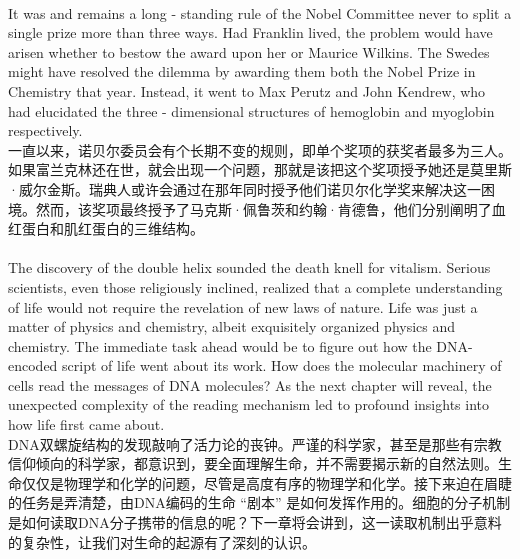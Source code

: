 \documentclass{article}
\begin{document}
\\
It was and remains a long - standing rule of the Nobel Committee never to split a single prize more than three ways. Had Franklin lived, the problem would have arisen whether to bestow the award upon her or Maurice Wilkins. The Swedes might have resolved the dilemma by awarding them both the Nobel Prize in Chemistry that year. Instead, it went to Max Perutz and John Kendrew, who had elucidated the three - dimensional structures of hemoglobin and myoglobin respectively.\\
一直以来，诺贝尔委员会有个长期不变的规则，即单个奖项的获奖者最多为三人。如果富兰克林还在世，就会出现一个问题，那就是该把这个奖项授予她还是莫里斯·威尔金斯。瑞典人或许会通过在那年同时授予他们诺贝尔化学奖来解决这一困境。然而，该奖项最终授予了马克斯·佩鲁茨和约翰·肯德鲁，他们分别阐明了血红蛋白和肌红蛋白的三维结构。 \\

\\
The discovery of the double helix sounded the death knell for vitalism. Serious scientists, even those religiously inclined, realized that a complete understanding of life would not require the revelation of new laws of nature. Life was just a matter of physics and chemistry, albeit exquisitely organized physics and chemistry. The immediate task ahead would be to figure out how the DNA-encoded script of life went about its work. How does the molecular machinery of cells read the messages of DNA molecules? As the next chapter will reveal, the unexpected complexity of the reading mechanism led to profound insights into how life first came about.\\
DNA双螺旋结构的发现敲响了活力论的丧钟。严谨的科学家，甚至是那些有宗教信仰倾向的科学家，都意识到，要全面理解生命，并不需要揭示新的自然法则。生命仅仅是物理学和化学的问题，尽管是高度有序的物理学和化学。接下来迫在眉睫的任务是弄清楚，由DNA编码的生命 “剧本” 是如何发挥作用的。细胞的分子机制是如何读取DNA分子携带的信息的呢？下一章将会讲到，这一读取机制出乎意料的复杂性，让我们对生命的起源有了深刻的认识。 \\

\newpage
\end{document}
